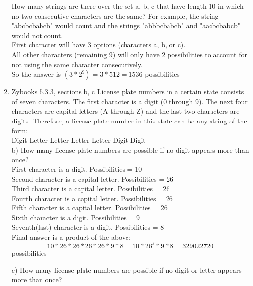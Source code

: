 \documentclass[14pt]{extreport}
\begin{document}
\begin{enumerate}[label=(\alph*)]
How many strings are there over the set {a, b, c} that have length 10 in which no two consecutive characters are the same? For example, the string "abcbcbabcb" would count and the strings "abbbcbabcb" and "aacbcbabcb" would not count.\\

First character will have 3 options (characters a, b, or c).\\
All other characters (remaining 9) will only have 2 possibilities to account for not using the same character consecutively. \\

So the answer is $ (3 * 2^{9}) = 3 * 512 = 1536  $ possibilities\\

\item Zybooks 5.3.3, sections b, c
\newline
License plate numbers in a certain state consists of seven characters. The first character is a digit (0 through 9). The next four characters are capital letters (A through Z) and the last two characters are digits. Therefore, a license plate number in this state can be any string of the form:\\

Digit-Letter-Letter-Letter-Letter-Digit-Digit\\

b) How many license plate numbers are possible if no digit appears more than once?\\

First character is a digit. Possibilities = 10\\
Second character is a capital letter. Possibilities = 26\\
Third character is a capital letter. Possibilities = 26\\
Fourth character is a capital letter. Possibilities = 26\\
Fifth character is a capital letter. Possibilities = 26\\
Sixth character is a digit. Possibilities = 9\\
Seventh(last) character is a digit. Possibilities = 8\\

Final answer is a product of the above:\\
\[ 10 * 26 * 26 * 26 * 26 * 9 * 8 = 10 * 26^{4} * 9 * 8 = 329022720  \] possibilities
\newline

c) How many license plate numbers are possible if no digit or letter appears more than once?\\


\end{enumerate}
\end{document}

